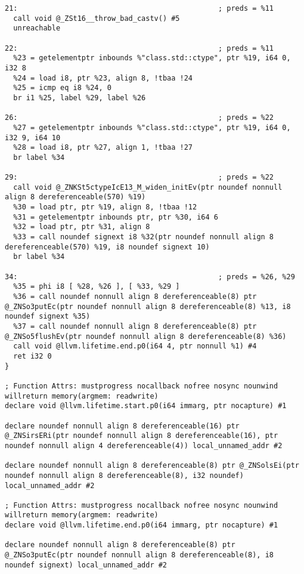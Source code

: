\documentclass[UTF8,a4paper,10pt]{ctexart}
\begin{document}
\begin{lstlisting}[title=O1优化,frame=trbl]
21:                                               ; preds = %11
  call void @_ZSt16__throw_bad_castv() #5
  unreachable

22:                                               ; preds = %11
  %23 = getelementptr inbounds %"class.std::ctype", ptr %19, i64 0, i32 8
  %24 = load i8, ptr %23, align 8, !tbaa !24
  %25 = icmp eq i8 %24, 0
  br i1 %25, label %29, label %26

26:                                               ; preds = %22
  %27 = getelementptr inbounds %"class.std::ctype", ptr %19, i64 0, i32 9, i64 10
  %28 = load i8, ptr %27, align 1, !tbaa !27
  br label %34

29:                                               ; preds = %22
  call void @_ZNKSt5ctypeIcE13_M_widen_initEv(ptr noundef nonnull align 8 dereferenceable(570) %19)
  %30 = load ptr, ptr %19, align 8, !tbaa !12
  %31 = getelementptr inbounds ptr, ptr %30, i64 6
  %32 = load ptr, ptr %31, align 8
  %33 = call noundef signext i8 %32(ptr noundef nonnull align 8 dereferenceable(570) %19, i8 noundef signext 10)
  br label %34

34:                                               ; preds = %26, %29
  %35 = phi i8 [ %28, %26 ], [ %33, %29 ]
  %36 = call noundef nonnull align 8 dereferenceable(8) ptr @_ZNSo3putEc(ptr noundef nonnull align 8 dereferenceable(8) %13, i8 noundef signext %35)
  %37 = call noundef nonnull align 8 dereferenceable(8) ptr @_ZNSo5flushEv(ptr noundef nonnull align 8 dereferenceable(8) %36)
  call void @llvm.lifetime.end.p0(i64 4, ptr nonnull %1) #4
  ret i32 0
}

; Function Attrs: mustprogress nocallback nofree nosync nounwind willreturn memory(argmem: readwrite)
declare void @llvm.lifetime.start.p0(i64 immarg, ptr nocapture) #1

declare noundef nonnull align 8 dereferenceable(16) ptr @_ZNSirsERi(ptr noundef nonnull align 8 dereferenceable(16), ptr noundef nonnull align 4 dereferenceable(4)) local_unnamed_addr #2

declare noundef nonnull align 8 dereferenceable(8) ptr @_ZNSolsEi(ptr noundef nonnull align 8 dereferenceable(8), i32 noundef) local_unnamed_addr #2

; Function Attrs: mustprogress nocallback nofree nosync nounwind willreturn memory(argmem: readwrite)
declare void @llvm.lifetime.end.p0(i64 immarg, ptr nocapture) #1

declare noundef nonnull align 8 dereferenceable(8) ptr @_ZNSo3putEc(ptr noundef nonnull align 8 dereferenceable(8), i8 noundef signext) local_unnamed_addr #2


\end{lstlisting}
\end{document}
